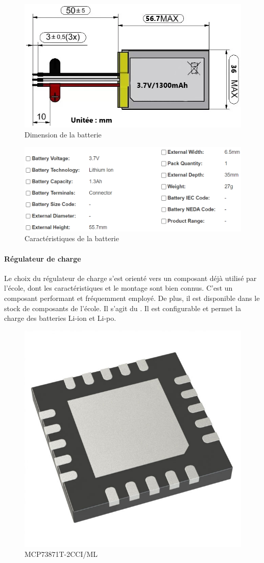 \begin{figure}[h]
	\centering
	\includegraphics[width=0.55\linewidth]{../figures/pre_etude/batt}
	\caption{Dimension de la batterie}
	\label{fig:batt}
\end{figure}

\begin{figure}[h]
	\centering
	\includegraphics[width=0.7\linewidth]{../figures/pre_etude/Carac_Batt}
	\caption{Caractéristiques de la batterie}
	\label{fig:caracbatt}
\end{figure}

\paragraph{Régulateur de charge} Le choix du régulateur de charge s'est orienté vers un composant déjà utilisé par l'école, dont les caractéristiques et le montage sont bien connus. C'est un composant performant et fréquemment employé. De plus, il est disponible dans le stock de composants de l'école. Il s'agit du . Il est configurable et permet la charge des batteries Li-ion et Li-po.

\begin{figure}[h]
	\centering
	\includegraphics[width=0.2\linewidth]{../figures/pre_etude/MCP}
	\caption{MCP73871T-2CCI/ML}
	\label{fig:mcp}
\end{figure}


